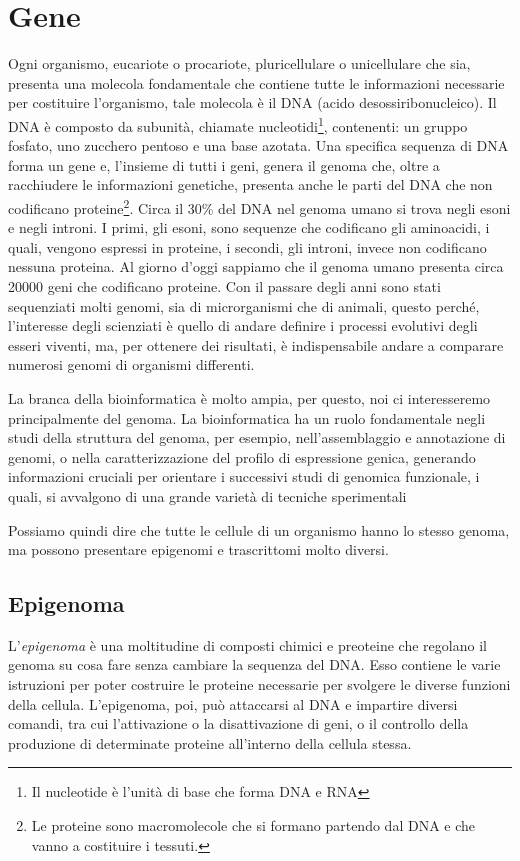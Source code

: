 \section{Gene}\label{sec:cap_one_bioinfo}
Ogni organismo, eucariote o procariote, pluricellulare o unicellulare che sia, presenta una molecola
fondamentale che contiene tutte le informazioni necessarie per costituire l'organismo, tale molecola
è il DNA (acido desossiribonucleico).
Il DNA è composto da subunità, chiamate nucleotidi\footnote{Il nucleotide è l'unità di base che forma DNA e RNA}, contenenti: un gruppo fosfato, uno zucchero
pentoso e una base azotata.
Una specifica sequenza di DNA forma un gene e, l'insieme di tutti i geni, genera il genoma che, oltre
a racchiudere le informazioni genetiche, presenta anche le parti del DNA che non codificano proteine\footnote{Le proteine sono macromolecole che si formano
partendo dal DNA e che vanno a costituire i tessuti.}.
Circa il 30\% del DNA nel genoma umano si trova negli esoni e negli introni. I primi, gli esoni, sono
sequenze che codificano gli aminoacidi, i quali, vengono espressi in proteine, i secondi, gli introni,
invece non codificano nessuna proteina. Al giorno d'oggi sappiamo che il genoma umano presenta
circa 20000 geni che codificano proteine.\cite{principiBiochimica}
Con il passare degli anni sono stati sequenziati molti genomi, sia di microrganismi che di animali,
questo perché, l'interesse degli scienziati è quello di andare definire i processi evolutivi degli esseri
viventi, ma, per ottenere dei risultati, è indispensabile andare a comparare numerosi genomi di
organismi differenti.

La branca della bioinformatica è molto ampia, per questo, noi ci interesseremo
principalmente del genoma.
La bioinformatica ha un ruolo
fondamentale negli studi della struttura del genoma, per esempio, nell'assemblaggio 
e annotazione di genomi, o nella caratterizzazione del profilo di espressione genica,
generando informazioni cruciali per orientare i successivi studi di genomica funzionale, i quali, si avvalgono di una grande varietà di tecniche sperimentali\cite{fondamentiBioinformatica}

Possiamo quindi dire che tutte le
cellule di un organismo hanno lo stesso genoma, ma
possono presentare epigenomi e trascrittomi molto
diversi.
\subsection{Epigenoma}\label{subsec:epigenomi}
L'\textit{epigenoma} è una moltitudine di composti chimici e preoteine che regolano il genoma su cosa fare senza cambiare la sequenza del DNA.
Esso contiene le varie istruzioni per poter costruire le proteine necessarie per svolgere le diverse funzioni della cellula.
L'epigenoma, poi, può attaccarsi al DNA e impartire diversi comandi, tra cui l'attivazione o la disattivazione di geni, o il controllo della produzione di
determinate proteine all'interno della cellula stessa.


